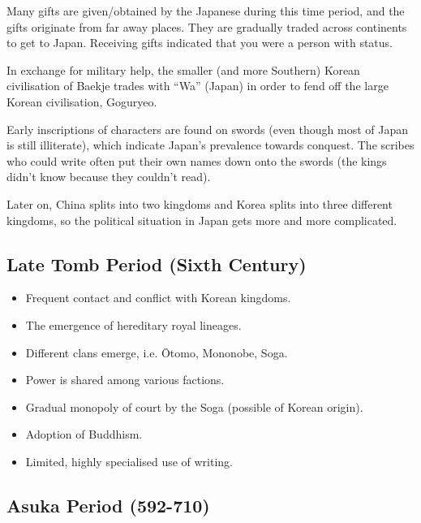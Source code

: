 \documentclass[class=article, crop=false]{standalone}
\begin{document}
  Many gifts are given/obtained by the Japanese during this time period, and the gifts originate from far away places. They are gradually traded across continents to get to Japan. Receiving gifts indicated that you were a person with status. \par
  In exchange for military help, the smaller (and more Southern) Korean civilisation of Baekje trades with ``Wa'' (Japan) in order to fend off the large Korean civilisation, Goguryeo. \par
  Early inscriptions of characters are found on swords (even though most of Japan is still illiterate), which indicate Japan's prevalence towards conquest. The scribes who could write often put their own names down onto the swords (the kings didn't know because they couldn't read). \par
  Later on, China splits into two kingdoms and Korea splits into three different kingdoms, so the political situation in Japan gets more and more complicated.
  \subsection{Late Tomb Period (Sixth Century)}
  \begin{itemize}
    \item Frequent contact and conflict with Korean kingdoms.
    \item The emergence of hereditary royal lineages.
    \item Different clans emerge, i.e. \=Otomo, Mononobe, Soga.
    \item Power is shared among various factions.
    \item Gradual monopoly of court by the Soga (possible of Korean origin).
    \item Adoption of Buddhism.
    \item Limited, highly specialised use of writing.
  \end{itemize}
  \subsection{Asuka Period (592-710)}
\end{document}
